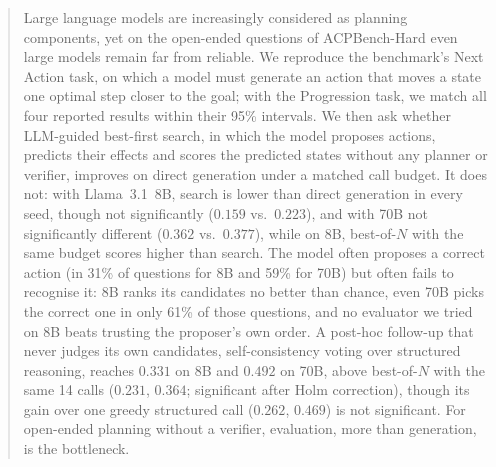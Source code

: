 \begin{abstract}
Large language models are increasingly considered as planning components, yet on the open-ended
questions of ACPBench-Hard even large models remain far from reliable. We reproduce the benchmark's
Next Action task, on which a model must generate an action that moves a state one optimal step
closer to the goal; with the Progression task, we match all four reported results within their 95\% intervals. We then ask whether LLM-guided best-first search, in which the model
proposes actions, predicts their effects and scores the predicted states without any planner or
verifier, improves on direct generation under a matched call budget. It does not: with
Llama~3.1~8B, search is lower than direct generation in every seed, though not significantly ($0.159$ vs.\ $0.223$), and with
70B not significantly different ($0.362$ vs.\ $0.377$), while on 8B, best-of-$N$ with the same budget scores higher than search. The model often proposes a correct action (in 31\% of questions for 8B and 59\% for
70B) but often fails to recognise it: 8B ranks its candidates no better than chance, even 70B picks the correct one in only 61\% of those questions, and no evaluator we tried on 8B beats trusting the proposer's own order. A post-hoc follow-up that never
judges its own candidates, self-consistency voting over structured reasoning, reaches $0.331$ on 8B and $0.492$ on 70B, above best-of-$N$ with the same 14 calls ($0.231$, $0.364$; significant after Holm correction), though its gain over one greedy structured call ($0.262$, $0.469$) is not significant. For open-ended planning without
a verifier, evaluation, more than generation, is the bottleneck.
\end{abstract}
